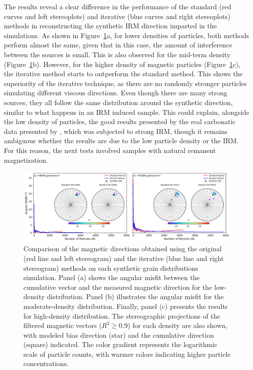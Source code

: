 The results reveal a clear difference in the performance of the standard (red curves and left stereoplots) and iterative (blue curves and right stereoplots) methods in reconstructing the synthetic IRM direction imparted in the simulations. As shown in Figure~\ref{synthetic-data-stereograms}a, for lower densities of particles, both methods perform almost the same, given that in this case, the amount of interference between the sources is small. This is also observed for the mid-term density (Figure~\ref{synthetic-data-stereograms}b). However, for the higher density of magnetic particles (Figure~\ref{synthetic-data-stereograms}c), the iterative method starts to outperform the standard method. This shows the superiority of the iterative technique, as there are no randomly stronger particles simulating different viscous directions. Even though there are many strong sources, they all follow the same distribution around the synthetic direction, similar to what happens in an IRM induced sample. This could explain, alongside the low density of particles, the good results presented by the real carbonatic data presented by \citet{Souza-Junior2024}, which was subjected to strong IRM, though it remains ambiguous whether the results are due to the low particle density or the IRM. For this reason, the next tests involved samples with natural remanent magnetization.

\begin{figure}[tb!]
  \centering
  \includegraphics[width=1.0\linewidth]{micromag-interfering-sources/figures/synthetic-different-densities-stereoplot.png}
  \caption{
Comparison of the magnetic directions obtained using the original (red line and left stereogram) and the iterative (blue line and right stereogram) methods on each synthetic grain distributions simulation. Panel (a) shows the angular misfit between the cumulative vector and the measured magnetic direction for the low-density distribution. Panel (b) illustrates the angular misfit for the moderate-density distribution. Finally, panel (c) presents the results for high-density distribution. The stereographic projections of the filtered magnetic vectors ($R^2 \geq 0.9$) for each density are also shown, with modeled bias direction (star) and the cumulative direction (square) indicated. The color gradient represents the logarithmic scale of particle counts, with warmer colors indicating higher particle concentrations.
  }
  \label{synthetic-data-stereograms}
\end{figure}


